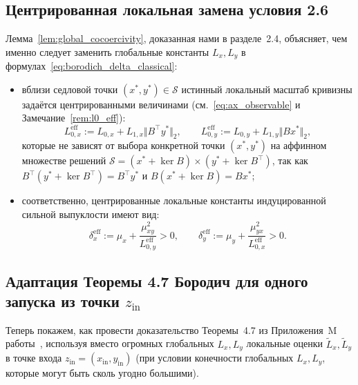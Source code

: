 \documentclass[11pt, a4paper]{article}
\theoremstyle{definition}
\begin{document}
\subsection{Центрированная локальная замена условия 2.6}

Лемма~\ref{lem:global_cocoercivity}, доказанная нами в разделе~2.4, объясняет, чем именно следует заменить глобальные константы $L_x, L_y$ в формулах~\eqref{eq:borodich_delta_classical}:
\begin{itemize}
    \item вблизи седловой точки $(x^*, y^*) \in \mathcal{S}$ истинный локальный масштаб кривизны задаётся центрированными величинами (см.~\eqref{eq:ax_observable} и Замечание~\ref{rem:l0_eff}):
    \[
    L_{0,x}^{\mathrm{eff}} := L_{0,x} + L_{1,x} \Vert B^\top y^* \Vert_2, \qquad L_{0,y}^{\mathrm{eff}} := L_{0,y} + L_{1,y} \Vert B x^* \Vert_2,
    \]
    которые не зависят от выбора конкретной точки $(x^*, y^*)$ на аффинном множестве решений $\mathcal{S} = (x^* + \ker B) \times (y^* + \ker B^\top)$, так как $B^\top(y^* + \ker B^\top) = B^\top y^*$ и $B(x^* + \ker B) = B x^*$;
    \item соответственно, центрированные локальные константы индуцированной сильной выпуклости имеют вид:
    \begin{equation}\label{eq:centered_delta}
    \delta_x^{\mathrm{eff}} := \mu_x + \frac{\mu_{xy}^2}{L_{0,y}^{\mathrm{eff}}} > 0, \qquad \delta_y^{\mathrm{eff}} := \mu_y + \frac{\mu_{yx}^2}{L_{0,x}^{\mathrm{eff}}} > 0.
    \end{equation}
\end{itemize}

\subsection{Адаптация Теоремы 4.7 Бородич для одного запуска из точки $z_{\mathrm{in}}$}

Теперь покажем, как провести доказательство Теоремы~4.7 из Приложения~M работы~\cite{Borodich2025}, используя вместо огромных глобальных $L_x, L_y$ локальные оценки $\widetilde{L}_x, \widetilde{L}_y$ в точке входа $z_{\mathrm{in}} = (x_{\mathrm{in}}, y_{\mathrm{in}})$ (при условии конечности глобальных $L_x, L_y$, которые могут быть сколь угодно большими).
\end{document}
